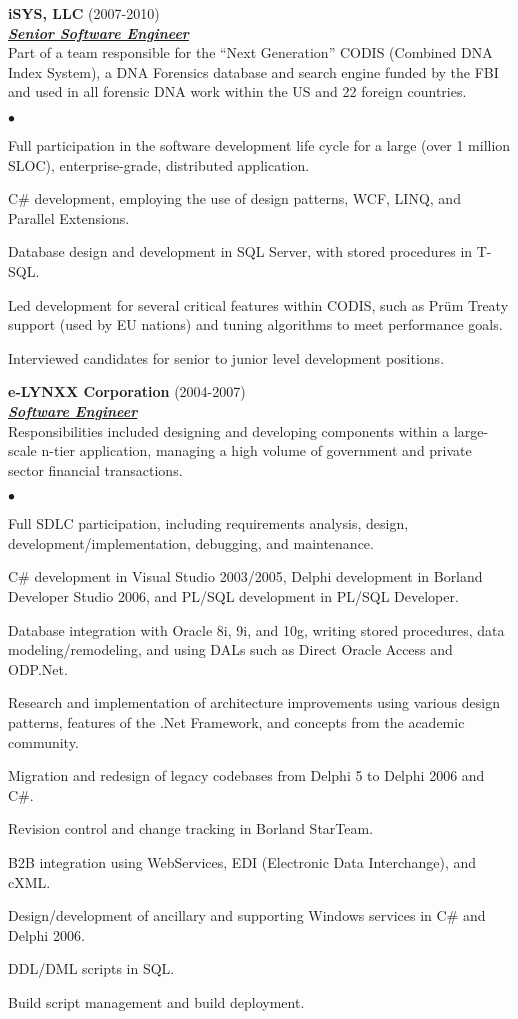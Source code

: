 \documentclass{article}
\newcommand{\employer}[3]{{ \textbf{#1} (#2)\\ \underline{\textbf{\emph{#3}}}\\  }}
\newenvironment{achievements}{\begin{list}{$\bullet$}{\topsep 0pt \itemsep
      -2pt}}{\vspace*{4pt}\end{list}}
\begin{document}
\employer{iSYS, LLC}{2007-2010}{Senior Software Engineer} Part of a team
responsible for the ``Next Generation'' CODIS (Combined DNA Index System), a
DNA Forensics database and search engine funded by the FBI and used in all
forensic DNA work within the US and 22 foreign countries.
\begin{achievements}
\item Full participation in the software development life cycle for a large
  (over 1 million SLOC), enterprise-grade, distributed application.
\item C\# development, employing the use of design patterns, WCF, LINQ, and
  Parallel Extensions.
\item Database design and development in SQL Server, with stored procedures in
  T-SQL.
\item Led development for several critical features within CODIS, such as
  Pr\"um Treaty support (used by EU nations) and tuning algorithms to meet
  performance goals.
\item Interviewed candidates for senior to junior level development positions.
\end{achievements}

\employer{e-LYNXX Corporation}{2004-2007}{Software Engineer} Responsibilities
included designing and developing components within a large-scale n-tier
application, managing a high volume of government and private sector financial
transactions.
\begin{achievements}
\item Full SDLC participation, including requirements analysis, design,
  development/implementation, debugging, and maintenance.
\item C\# development in Visual Studio 2003/2005, Delphi development in Borland
  Developer Studio 2006, and PL/SQL development in PL/SQL Developer.
\item Database integration with Oracle 8i, 9i, and 10g, writing stored
  procedures, data modeling/remodeling, and using DALs such as Direct Oracle
  Access and ODP.Net.
\item Research and implementation of architecture improvements using various
  design patterns, features of the .Net Framework, and concepts from the
  academic community.
\item Migration and redesign of legacy codebases from Delphi 5 to Delphi 2006
  and C\#.
\item Revision control and change tracking in Borland StarTeam.
\item B2B integration using WebServices, EDI (Electronic Data Interchange), and
  cXML.
\item Design/development of ancillary and supporting Windows services in C\# and
  Delphi 2006.
\item DDL/DML scripts in SQL.
\item Build script management and build deployment.
\end{achievements}
\end{document}
